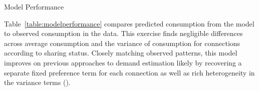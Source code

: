 \documentclass[12pt]{article}
\begin{document}
\begin{table}
\centering
\caption{Model Performance}\label{table:modelperformance}

\end{table}
Table~\ref{table:modelperformance} compares predicted consumption from the model to observed consumption in the data.  This exercise finds negligible differences across average consumption and the variance of consumption for connections according to sharing status.  Closely matching observed patterns, this model improves on previous approaches to demand estimation likely by recovering a separate fixed preference term for each connection as well as rich heterogeneity in the variance terms (\cite{szabo2015value}). 

\end{document}
